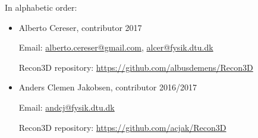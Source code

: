 \documentclass[11pt]{scrartcl}
\begin{document}
In alphabetic order:
\begin{itemize}
    \item Alberto Cereser, contributor 2017

    Email: \href{alberto.cereser@gmail.com}{alberto.cereser@gmail.com}, \href{alcer@fysik.dtu.dk}{alcer@fysik.dtu.dk}

    Recon3D repository: \href{https://github.com/albusdemens/Recon3D}{https://github.com/albusdemens/Recon3D}

    \item Anders Clemen Jakobsen, contributor 2016/2017

    Email: \href{andcj@fysik.dtu.dk}{andcj@fysik.dtu.dk}

    Recon3D repository: \href{https://github.com/acjak/Recon3D}{https://github.com/acjak/Recon3D}

\end{itemize}



\end{document}
